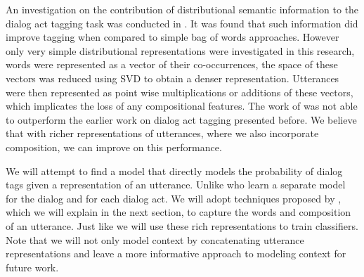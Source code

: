 An investigation on the contribution of distributional semantic information to the dialog act tagging task was conducted in . It was found that such information did improve tagging when compared to simple bag of words approaches. However only very simple distributional representations were investigated in this research, words were represented as a vector of their co-occurrences, the space of these vectors was reduced using SVD to obtain a denser representation. Utterances were then represented as point wise multiplications or additions of these vectors, which implicates the loss of any compositional features. The work of  was not able to outperform the earlier work on dialog act tagging presented before. We believe that with richer representations of utterances, where we also incorporate composition, we can improve on this performance.


We will attempt to find a model that directly models the probability of dialog tags given a representation of an utterance. Unlike  who learn a separate model for the dialog and for each dialog act. We will adopt techniques proposed by , which we will explain in the next section, to capture the words and composition of an utterance. Just like  we will use these rich representations to train classifiers. Note that we will not only model context by concatenating utterance representations and leave a more informative approach to modeling context for future work.